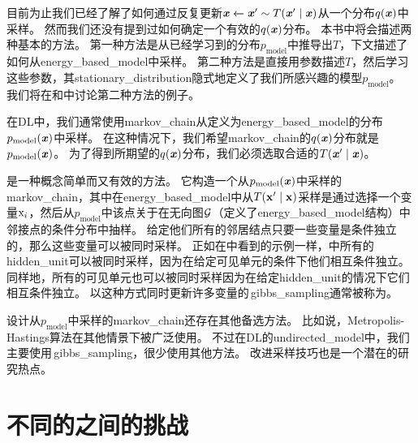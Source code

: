 \section{}
\label{sec:gibbs_sampling}

目前为止我们已经了解了如何通过反复更新$\boldsymbol{\mathit{x}} \xleftarrow{} \boldsymbol{\mathit{x}}'\sim T(\boldsymbol{\mathit{x}}'\mid\boldsymbol{\mathit{x}})$从一个分布$q(\boldsymbol{\mathit{x}})$中采样。 %
然而我们还没有提到过如何确定一个有效的$q(\boldsymbol{\mathit{x}})$分布。%
本书中将会描述两种基本的方法。  
第一种方法是从已经学习到的分布$p_{\text{model}}$中推导出$T$，下文描述了如何从\gls{energy_based_model}中采样。
第二种方法是直接用参数描述$T$，然后学习这些参数，其\gls{stationary_distribution}隐式地定义了我们所感兴趣的模型$p_{\text{model}}$。
我们将在和中讨论第二种方法的例子。  


在\gls{DL}中，我们通常使用\gls{markov_chain}从定义为\gls{energy_based_model}的分布$p_{\text{model}}(\boldsymbol{\mathit{x}})$中采样。
在这种情况下，我们希望\gls{markov_chain}的$q(\boldsymbol{\mathit{x}})$分布就是$p_{\text{model}}(\boldsymbol{\mathit{x}})$。
为了得到所期望的$q(\boldsymbol{\mathit{x}})$分布，我们必须选取合适的$T(\boldsymbol{\mathit{x}}'\mid \boldsymbol{\mathit{x}})$。


是一种概念简单而又有效的方法。
它构造一个从$p_{\text{model}}(\boldsymbol{\mathit{x}})$中采样的\gls{markov_chain}，其中在\gls{energy_based_model}中从$T(\mathbf{x}'\mid \mathbf{x})$采样是通过选择一个变量$\mathrm{x}_i$，然后从$p_{\text{model}}$中该点关于在无向图$\mathcal{G}$（定义了\gls{energy_based_model}结构）中邻接点的条件分布中抽样。
给定他们所有的邻居结点只要一些变量是条件独立的，那么这些变量可以被同时采样。  %
正如在中看到的示例一样，中所有的\gls{hidden_unit}可以被同时采样，因为在给定可见单元的条件下他们相互条件独立。
同样地，所有的可见单元也可以被同时采样因为在给定\gls{hidden_unit}的情况下它们相互条件独立。 
以这种方式同时更新许多变量的\,\gls{gibbs_sampling}通常被称为。   

设计从$p_{\text{model}}$中采样的\gls{markov_chain}还存在其他备选方法。  
比如说，Metropolis-Hastings算法在其他情景下被广泛使用。
不过在\gls{DL}的\gls{undirected_model}中，我们主要使用\,\gls{gibbs_sampling}，很少使用其他方法。 
改进采样技巧也是一个潜在的研究热点。


\section{不同的之间的挑战}
\label{sec:the_challenge_of_mixing_between_separated_modes}

